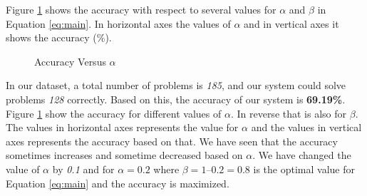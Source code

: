 \documentclass[document.tex]{subfiles}
\begin{document}
Figure \ref{fig:accvsalpha} shows the accuracy with respect to several values for $\alpha$ and $\beta$ in Equation \ref{eq:main}. In horizontal axes the values of $\alpha$ and in vertical axes it shows the accuracy (\%).
\begin{figure}[H]
	\begin{center}
	\end{center}
	\caption{Accuracy Versus $\alpha$}
	\label{fig:accvsalpha}
\end{figure}

In our dataset, a total number of problems is \textit{185}, and our system could solve problems \textit{128} correctly. Based on this, the accuracy of our system is \textbf{69.19\%}. Figure \ref{fig:accvsalpha} show the accuracy for different values of $\alpha$. In reverse that is also for $\beta$. The values in horizontal axes represents the value for $\alpha$ and the values in vertical axes represents the accuracy based on that. We have seen that the accuracy sometimes increases and sometime decreased based on $\alpha$. We have changed the value of $\alpha$ by \textit{0.1} and for $\alpha=0.2$ where $\beta = 1 – 0.2 = 0.8$ is the optimal value for Equation \ref{eq:main} and the accuracy is maximized.
\end{document}
